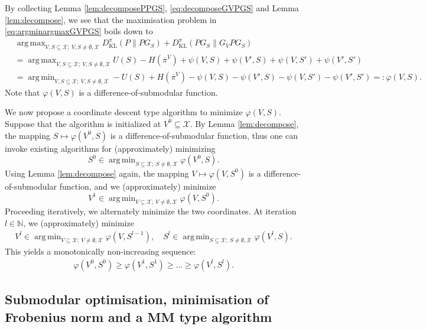 \documentclass[EJP]{ejpecp} %
\DeclareMathOperator*{\argmin}{arg\,min}
\DeclareMathOperator*{\argmax}{arg\,max}
\begin{document}
By collecting Lemma \ref{lem:decomposePPGS}, \eqref{eq:decomposeGVPGS} and Lemma \ref{lem:decompose}, we see that the maximisation problem in \eqref{eq:argminargmaxGVPGS} boils down to
\begin{align*}
    &\argmax_{V,S \subseteq \mathcal{X};~V,S \neq \emptyset, \mathcal{X}} D^\pi_{\mathrm{KL}}(P \| P G_S) + D^\pi_{\mathrm{KL}}(P G_S \| G_V P G_S) \\
    &= \argmax_{V,S \subseteq \mathcal{X};~V,S \neq \emptyset, \mathcal{X}} U(S) - H(\overline{\pi}^V) + \psi(V,S) + \psi(V',S) + \psi(V,S') + \psi(V',S') \\
    &= \argmin_{V,S \subseteq \mathcal{X};~V,S \neq \emptyset, \mathcal{X}} -U(S) + H(\overline{\pi}^V) - \psi(V,S) - \psi(V',S) - \psi(V,S') - \psi(V',S') =: \varphi(V,S).
\end{align*}
Note that $\varphi(V,S)$ is a difference-of-submodular function.

We now propose a coordinate descent type algorithm to minimize $\varphi(V,S)$. Suppose that the algorithm is initialized at $V^0 \subseteq \mathcal{X}$. By Lemma \ref{lem:decompose}, the mapping $S \mapsto \varphi(V^0,S)$ is a difference-of-submodular function, thus one can invoke existing algorithms for (approximately) minimizing 
$$S^0 \in \argmin_{S \subseteq \mathcal{X};~S \neq \emptyset, \mathcal{X}} \varphi(V^0,S).$$
Using Lemma \ref{lem:decompose} again, the mapping $V \mapsto \varphi(V,S^0)$ is a difference-of-submodular function, and we (approximately) minimize
$$V^1 \in \argmin_{V \subseteq \mathcal{X};~V \neq \emptyset, \mathcal{X}} \varphi(V,S^0).$$
Proceeding iteratively, we alternately minimize the two coordinates. At iteration $l \in \mathbb{N}$, we (approximately) minimize
\begin{align*}
    V^l \in \argmin_{V \subseteq \mathcal{X};~V \neq \emptyset, \mathcal{X}} \varphi(V,S^{l-1}), \quad S^l \in \argmin_{S \subseteq \mathcal{X};~S \neq \emptyset, \mathcal{X}} \varphi(V^l,S).
\end{align*}
This yields a monotonically non-increasing sequence:
\begin{align*}
    \varphi(V^0,S^0) \geq \varphi(V^1,S^1) \geq \ldots \geq \varphi(V^l,S^l).
\end{align*}

\subsection{Submodular optimisation, minimisation of Frobenius norm and a MM type algorithm} \label{sub:frobsubmod}
\end{document}
